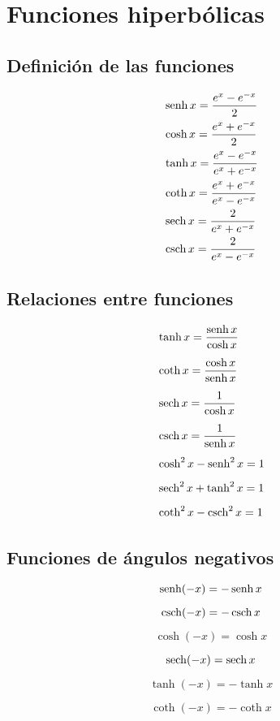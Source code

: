 \chapter*{Funciones hiperbólicas}



\begin{minipage}[t]{0.5\textwidth}

\section*{Definición de las funciones}

\begin{align*}
& \operatorname{senh} x = \frac{e^x-e^{-x}}{2}\\
& \cosh x = \frac{e^x+e^{-x}}{2}\\
& \tanh x = \frac{e^x-e^{-x}}{e^x+e^{-x}}\\
& \coth x = \frac{e^x+e^{-x}}{e^x-e^{-x}}\\
& \operatorname{sech} x = \frac{2}{e^x+e^{-x}}\\
& \operatorname{csch} x = \frac{2}{e^x-e^{-x}}
\end{align*}

\end{minipage}  \begin{minipage}[t]{0.5\textwidth}
\section*{Relaciones entre funciones}
\begin{align*}
& \tanh x = \frac{\operatorname{senh} x}{\cosh x} \\[5pt]
& \coth x = \frac{\cosh x}{\operatorname{senh} x} \\[5pt]
& \operatorname{sech} x = \frac{1}{\cosh x}  \\[5pt]
& \operatorname{csch} x = \frac{1}{\operatorname{senh} x} \\[5pt]
& \cosh^2 x - \operatorname{senh}^2 x = 1 \\[5pt]
& \operatorname{sech} ^2 x + \tanh^2 x = 1 \\[5pt]
& \coth ^2 x - \operatorname{csch} ^2 x = 1 
\end{align*}
\end{minipage} 

\section*{Funciones de ángulos negativos}

\begin{minipage}[c]{0.3\textwidth}
$$ \operatorname{senh} (-x)=-\operatorname{senh} x$$

$$ \operatorname{csch} (-x)=-\operatorname{csch} x$$
\end{minipage}  \begin{minipage}[c]{0.3\textwidth}
$$\cosh (-x)=\cosh x$$

$$\operatorname{sech} (-x)=\operatorname{sech} x$$

\end{minipage}  \begin{minipage}[c]{0.3\textwidth}
$$\tanh (-x)=-\tanh x$$

$$\coth (-x)=-\coth x$$

\end{minipage}

